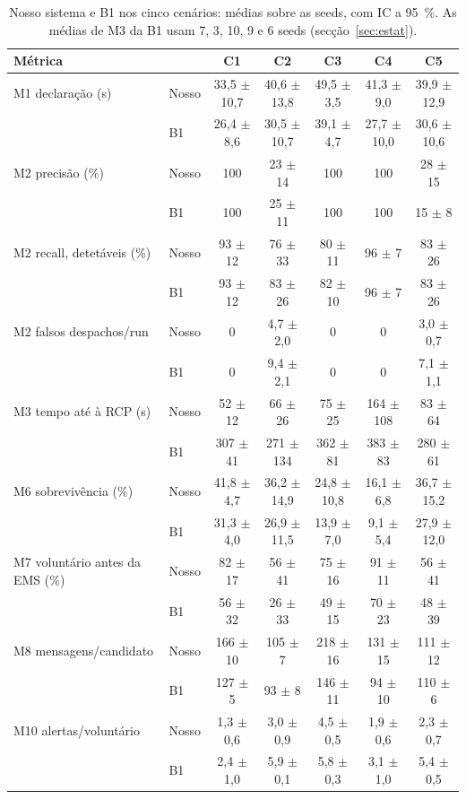 \documentclass[11pt,a4paper]{article}
\begin{document}
\begin{table}[htbp]
\centering
\footnotesize
\setlength{\tabcolsep}{4pt}
\caption{Nosso sistema e B1 nos cinco cenários: médias sobre as seeds, com IC a 95~\%. As médias de M3 da B1 usam 7, 3, 10, 9 e 6 seeds (secção~\ref{sec:estat}).}\label{tab:b1}
\begin{tabular}{llccccc}
\toprule
Métrica & & C1 & C2 & C3 & C4 & C5 \\
\midrule
M1 declaração (s) & Nosso & 33,5 $\pm$ 10,7 & 40,6 $\pm$ 13,8 & 49,5 $\pm$ 3,5 & 41,3 $\pm$ 9,0 & 39,9 $\pm$ 12,9 \\
 & B1 & 26,4 $\pm$ 8,6 & 30,5 $\pm$ 10,7 & 39,1 $\pm$ 4,7 & 27,7 $\pm$ 10,0 & 30,6 $\pm$ 10,6 \\
\addlinespace
M2 precisão (\%) & Nosso & 100 & 23 $\pm$ 14 & 100 & 100 & 28 $\pm$ 15 \\
 & B1 & 100 & 25 $\pm$ 11 & 100 & 100 & 15 $\pm$ 8 \\
\addlinespace
M2 recall, detetáveis (\%) & Nosso & 93 $\pm$ 12 & 76 $\pm$ 33 & 80 $\pm$ 11 & 96 $\pm$ 7 & 83 $\pm$ 26 \\
 & B1 & 93 $\pm$ 12 & 83 $\pm$ 26 & 82 $\pm$ 10 & 96 $\pm$ 7 & 83 $\pm$ 26 \\
\addlinespace
M2 falsos despachos/run & Nosso & 0 & 4,7 $\pm$ 2,0 & 0 & 0 & 3,0 $\pm$ 0,7 \\
 & B1 & 0 & 9,4 $\pm$ 2,1 & 0 & 0 & 7,1 $\pm$ 1,1 \\
\addlinespace
M3 tempo até à RCP (s) & Nosso & 52 $\pm$ 12 & 66 $\pm$ 26 & 75 $\pm$ 25 & 164 $\pm$ 108 & 83 $\pm$ 64 \\
 & B1 & 307 $\pm$ 41 & 271 $\pm$ 134 & 362 $\pm$ 81 & 383 $\pm$ 83 & 280 $\pm$ 61 \\
\addlinespace
M6 sobrevivência (\%) & Nosso & 41,8 $\pm$ 4,7 & 36,2 $\pm$ 14,9 & 24,8 $\pm$ 10,8 & 16,1 $\pm$ 6,8 & 36,7 $\pm$ 15,2 \\
 & B1 & 31,3 $\pm$ 4,0 & 26,9 $\pm$ 11,5 & 13,9 $\pm$ 7,0 & 9,1 $\pm$ 5,4 & 27,9 $\pm$ 12,0 \\
\addlinespace
M7 voluntário antes da EMS (\%) & Nosso & 82 $\pm$ 17 & 56 $\pm$ 41 & 75 $\pm$ 16 & 91 $\pm$ 11 & 56 $\pm$ 41 \\
 & B1 & 56 $\pm$ 32 & 26 $\pm$ 33 & 49 $\pm$ 15 & 70 $\pm$ 23 & 48 $\pm$ 39 \\
\addlinespace
M8 mensagens/candidato & Nosso & 166 $\pm$ 10 & 105 $\pm$ 7 & 218 $\pm$ 16 & 131 $\pm$ 15 & 111 $\pm$ 12 \\
 & B1 & 127 $\pm$ 5 & 93 $\pm$ 8 & 146 $\pm$ 11 & 94 $\pm$ 10 & 110 $\pm$ 6 \\
\addlinespace
M10 alertas/voluntário & Nosso & 1,3 $\pm$ 0,6 & 3,0 $\pm$ 0,9 & 4,5 $\pm$ 0,5 & 1,9 $\pm$ 0,6 & 2,3 $\pm$ 0,7 \\
 & B1 & 2,4 $\pm$ 1,0 & 5,9 $\pm$ 0,1 & 5,8 $\pm$ 0,3 & 3,1 $\pm$ 1,0 & 5,4 $\pm$ 0,5 \\
\bottomrule
\end{tabular}
\end{table}
\end{document}
